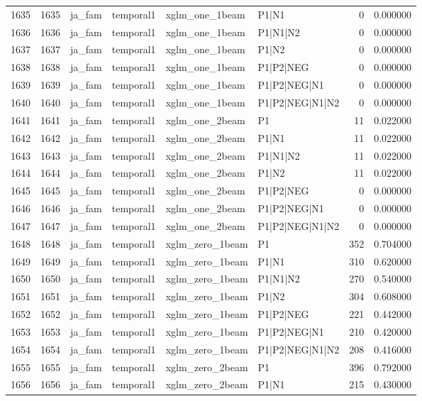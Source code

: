 \begin{tabular}{lrllllrr}
1635 & 1635 & ja_fam & temporal1 & xglm_one_1beam & P1|N1 & 0 & 0.000000 \\
1636 & 1636 & ja_fam & temporal1 & xglm_one_1beam & P1|N1|N2 & 0 & 0.000000 \\
1637 & 1637 & ja_fam & temporal1 & xglm_one_1beam & P1|N2 & 0 & 0.000000 \\
1638 & 1638 & ja_fam & temporal1 & xglm_one_1beam & P1|P2|NEG & 0 & 0.000000 \\
1639 & 1639 & ja_fam & temporal1 & xglm_one_1beam & P1|P2|NEG|N1 & 0 & 0.000000 \\
1640 & 1640 & ja_fam & temporal1 & xglm_one_1beam & P1|P2|NEG|N1|N2 & 0 & 0.000000 \\
1641 & 1641 & ja_fam & temporal1 & xglm_one_2beam & P1 & 11 & 0.022000 \\
1642 & 1642 & ja_fam & temporal1 & xglm_one_2beam & P1|N1 & 11 & 0.022000 \\
1643 & 1643 & ja_fam & temporal1 & xglm_one_2beam & P1|N1|N2 & 11 & 0.022000 \\
1644 & 1644 & ja_fam & temporal1 & xglm_one_2beam & P1|N2 & 11 & 0.022000 \\
1645 & 1645 & ja_fam & temporal1 & xglm_one_2beam & P1|P2|NEG & 0 & 0.000000 \\
1646 & 1646 & ja_fam & temporal1 & xglm_one_2beam & P1|P2|NEG|N1 & 0 & 0.000000 \\
1647 & 1647 & ja_fam & temporal1 & xglm_one_2beam & P1|P2|NEG|N1|N2 & 0 & 0.000000 \\
1648 & 1648 & ja_fam & temporal1 & xglm_zero_1beam & P1 & 352 & 0.704000 \\
1649 & 1649 & ja_fam & temporal1 & xglm_zero_1beam & P1|N1 & 310 & 0.620000 \\
1650 & 1650 & ja_fam & temporal1 & xglm_zero_1beam & P1|N1|N2 & 270 & 0.540000 \\
1651 & 1651 & ja_fam & temporal1 & xglm_zero_1beam & P1|N2 & 304 & 0.608000 \\
1652 & 1652 & ja_fam & temporal1 & xglm_zero_1beam & P1|P2|NEG & 221 & 0.442000 \\
1653 & 1653 & ja_fam & temporal1 & xglm_zero_1beam & P1|P2|NEG|N1 & 210 & 0.420000 \\
1654 & 1654 & ja_fam & temporal1 & xglm_zero_1beam & P1|P2|NEG|N1|N2 & 208 & 0.416000 \\
1655 & 1655 & ja_fam & temporal1 & xglm_zero_2beam & P1 & 396 & 0.792000 \\
1656 & 1656 & ja_fam & temporal1 & xglm_zero_2beam & P1|N1 & 215 & 0.430000 \\

\end{tabular}
